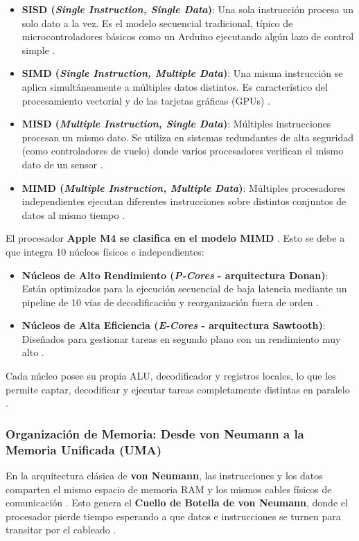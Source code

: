 \documentclass[12pt,a4paper]{article}
\begin{document}
\begin{itemize}[leftmargin=*]
    \item \textbf{SISD (\textit{Single Instruction, Single Data})}: Una sola instrucción procesa un solo dato a la vez. Es el modelo secuencial tradicional, típico de microcontroladores básicos como un Arduino ejecutando algún lazo de control simple \cite{flynn}.
    \item \textbf{SIMD (\textit{Single Instruction, Multiple Data})}: Una misma instrucción se aplica simultáneamente a múltiples datos distintos. Es característico del procesamiento vectorial y de las tarjetas gráficas (GPUs) \cite{flynn}.
    \item \textbf{MISD (\textit{Multiple Instruction, Single Data})}: Múltiples instrucciones procesan un mismo dato. Se utiliza en sistemas redundantes de alta seguridad (como controladores de vuelo) donde varios procesadores verifican el mismo dato de un sensor \cite{flynn}.
    \item \textbf{MIMD (\textit{Multiple Instruction, Multiple Data})}: Múltiples procesadores independientes ejecutan diferentes instrucciones sobre distintos conjuntos de datos al mismo tiempo \cite{flynn}.
\end{itemize}

El procesador \textbf{Apple M4 se clasifica en el modelo MIMD} \cite{flynn, apple_m4}. Esto se debe a que integra 10 núcleos físicos e independientes:
\begin{itemize}[leftmargin=*]
    \item \textbf{Núcleos de Alto Rendimiento (\textit{P-Cores} - arquitectura Donan)}: Están optimizados para la ejecución secuencial de baja latencia mediante un pipeline de 10 vías de decodificación y reorganización fuera de orden \cite{apple_m4}.
    \item \textbf{Núcleos de Alta Eficiencia (\textit{E-Cores} - arquitectura Sawtooth)}: Diseñados para gestionar tareas en segundo plano con un rendimiento muy alto \cite{apple_m4}.
\end{itemize}
Cada núcleo posee su propia ALU, decodificador y registros locales, lo que les permite captar, decodificar y ejecutar tareas completamente distintas en paralelo \cite{apple_m4}.

\subsubsection{Organización de Memoria: Desde von Neumann a la Memoria Unificada (UMA)}
En la arquitectura clásica de \textbf{von Neumann}, las instrucciones y los datos comparten el mismo espacio de memoria RAM y los mismos cables físicos de comunicación \cite{patterson}. Esto genera el \textbf{Cuello de Botella de von Neumann}, donde el procesador pierde tiempo esperando a que datos e instrucciones se turnen para transitar por el cableado \cite{patterson}.
\end{document}

